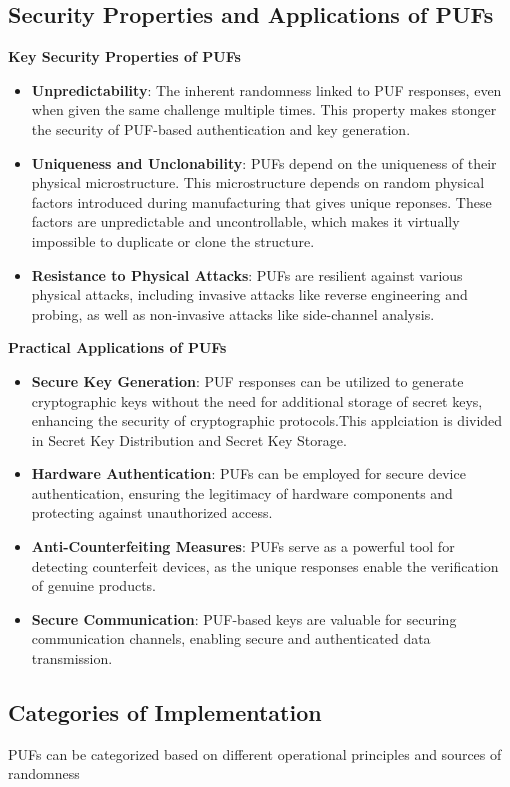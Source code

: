 \subsection{Security Properties and Applications of PUFs}
\textbf{Key Security Properties of PUFs}
\begin{itemize}
\item \textbf{Unpredictability}: The inherent randomness linked to  PUF responses, even when given the same challenge multiple times. This property makes stonger the security of PUF-based authentication and key generation.
\item \textbf{Uniqueness and Unclonability}: PUFs depend on the uniqueness of their physical microstructure. This microstructure depends on random physical factors introduced during manufacturing that gives unique reponses. These factors are unpredictable and uncontrollable, which makes it virtually impossible to duplicate or clone the structure.
\item \textbf{Resistance to Physical Attacks}: PUFs are resilient against various physical attacks, including invasive attacks like reverse engineering and probing, as well as non-invasive attacks like side-channel analysis.
\end{itemize}
\textbf{Practical Applications of PUFs}
\begin{itemize}
\item \textbf{Secure Key Generation}: PUF responses can be utilized to generate cryptographic keys without the need for additional storage of secret keys, enhancing the security of cryptographic protocols.This applciation is divided in Secret Key Distribution and Secret Key Storage.
\item \textbf{Hardware Authentication}: PUFs can be employed for secure device authentication, ensuring the legitimacy of hardware components and protecting against unauthorized access.
\item \textbf{Anti-Counterfeiting Measures}: PUFs serve as a powerful tool for detecting counterfeit devices, as the unique responses enable the verification of genuine products.
\item \textbf{Secure Communication}: PUF-based keys are valuable for securing communication channels, enabling secure and authenticated data transmission.
\end{itemize}

\subsection{Categories of Implementation}
PUFs can be categorized based on different operational principles and sources of randomness
